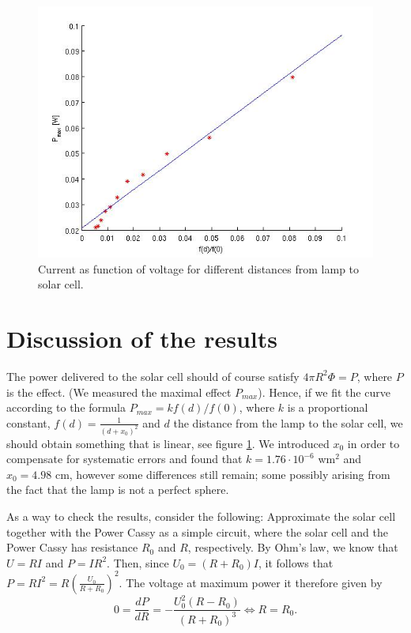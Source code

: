 \documentclass[a4paper]{article}
\begin{document}
\begin{figure}[h!]
  \label{pmaxvsf}
  \begin{center}
    \includegraphics[scale=0.2]{pmaxvsf.jpg}
  \end{center}
  \caption{Current as function of voltage for different distances from lamp to solar cell.}
\end{figure}
\section{Discussion of the results}
The power delivered to the solar cell should of course satisfy $4\pi R^2\Phi = P$, where $P$ is the effect. (We measured the maximal effect $P_{max}$). Hence, if we fit the curve according to the formula $P_{max}=kf(d)/f(0)$, where $k$ is a proportional constant, $f(d)=\frac{1}{(d+x_0)^2}$ and $d$ the distance from the lamp to the solar cell, we should obtain something that is linear, see figure \ref{pmaxvsf}. We introduced $x_0$ in order to compensate for systematic errors and found that $k=1.76\cdot 10^{-6}$ wm${}^2$ and $x_0=4.98$ cm, however some differences still remain; some possibly arising from the fact that the lamp is not a perfect sphere.

As a way to check the results, consider the following: Approximate the solar cell together with the Power Cassy as a simple circuit, where the solar cell and the Power Cassy has resistance $R_0$ and $R$, respectively. 
By Ohm's law, we know that $U=RI$ and $P=IR^2$. Then, since $U_0=(R+R_0)I$, it follows that $P=RI^2=R\left( \frac{U_0}{R+R_0} \right)^2$.
The voltage at maximum power it therefore given by
\begin{displaymath}
  0=\frac{dP}{dR}=-\frac{U_0^2(R-R_0)}{(R+R_0)^3}\iff R=R_0.
\end{displaymath}
\end{document}
